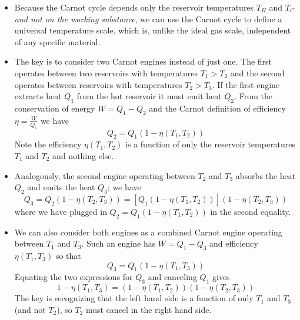\documentclass[11pt, a4paper]{article}
\begin{document}
\begin{itemize}
	\item Because the Carnot cycle depends only the reservoir temperatures $ T_{H} $ and $ T_{C} $ \textit{and not on the working substance}, we can use the Carnot cycle to define a universal temperature scale, which is, unlike the ideal gas scale,  independent of any specific material.
	
	\item The key is to consider two Carnot engines instead of just one. The first operates between two reservoirs with temperatures $ T_{1} > T_{2} $ and the second operates between reservoirs with temperatures $ T_{2} > T_{3} $. If the first engine extracts heat $ Q_{1} $ from the hot reservoir it must emit heat $ Q_{2} $. From the conservation of energy $ W = Q_{1} - Q_{2} $ and the Carnot definition of efficiency $ \eta = \frac{W}{Q_{1}} $ we have
	\begin{equation*}
		Q_{2} = Q_{1}(1 - \eta(T_{1}, T_{2}))
	\end{equation*}
	Note the efficiency $ \eta(T_{1}, T_{2}) $ is a function of only the reservoir temperatures $ T_{1} $ and $ T_{2} $ and nothing else.
	
	\item Analogously, the second engine operating between $ T_{2} $ and $ T_{3} $ absorbs the heat $ Q_{2} $ and emits the heat $ Q_{3} $; we have
	\begin{equation*}
		Q_{3} = Q_{2}(1 - \eta(T_{2}, T_{3})) = \left[Q_{1}(1 - \eta(T_{1}, T_{2}))\right](1 - \eta(T_{2}, T_{3}))
	\end{equation*}
	where we have plugged in $ Q_{2} = Q_{1}(1 - \eta(T_{1}, T_{2})) $ in the second equality.
	
	\item We can also consider both engines as a combined Carnot engine operating between $ T_{1} $ and $ T_{3} $. Such an engine has $ W = Q_{1} - Q_{3} $ and efficiency $ \eta(T_{1}, T_{3}) $ so that
	\begin{equation*}
		Q_{3} = Q_{1}(1 - \eta(T_{1}, T_{3}))
	\end{equation*}
	Equating the two expressions for $ Q_{3} $ and canceling $ Q_{1} $ gives
	\begin{equation*}
		1 - \eta(T_{1}, T_{3}) = (1 - \eta(T_{1}, T_{2}))(1 - \eta(T_{2}, T_{3}))
	\end{equation*}
	The key is recognizing that the left hand side is a function of only $ T_{1} $ and $ T_{3} $ (and not $ T_{2} $), so $ T_{2} $ must cancel in the right hand side. 
	

\end{itemize}
\end{document}

